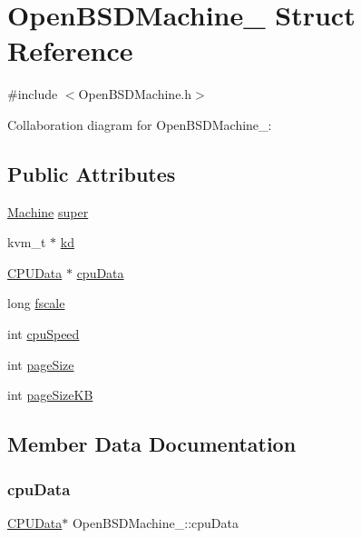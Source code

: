 \hypertarget{structOpenBSDMachine__}{}\section{Open\+B\+S\+D\+Machine\+\_\+ Struct Reference}
\label{structOpenBSDMachine__}


{\ttfamily \#include $<$Open\+B\+S\+D\+Machine.\+h$>$}



Collaboration diagram for Open\+B\+S\+D\+Machine\+\_\+\+:
\subsection*{Public Attributes}
\begin{DoxyCompactItemize}
\item 
\hyperlink{Machine_8h_aa3706f95e4706b9d02979efcabb1341d}{Machine} \hyperlink{structOpenBSDMachine___a8a545d14dad8c9652be6b1f7354b6a84}{super}
\item 
kvm\+\_\+t $\ast$ \hyperlink{structOpenBSDMachine___a5412bdddfb081876ed0a38505955cf32}{kd}
\item 
\hyperlink{DragonFlyBSDMachine_8h_a144f55b34d84d75d470d730435fef363}{C\+P\+U\+Data} $\ast$ \hyperlink{structOpenBSDMachine___a9d9559112a47916c4765872159b4ed49}{cpu\+Data}
\item 
long \hyperlink{structOpenBSDMachine___ad59c1c1e0677c5f156ead7c10056927a}{fscale}
\item 
int \hyperlink{structOpenBSDMachine___a3451335f1b3ff72e17d6f44dfee2ca3e}{cpu\+Speed}
\item 
int \hyperlink{structOpenBSDMachine___a0a5fc14b904bef686b3e515fc379ac4d}{page\+Size}
\item 
int \hyperlink{structOpenBSDMachine___abd95eefc334ee16913fd33ba2c4626ce}{page\+Size\+KB}
\end{DoxyCompactItemize}


\subsection{Member Data Documentation}
\mbox{\label{structOpenBSDMachine___a9d9559112a47916c4765872159b4ed49}} 
\subsubsection{\texorpdfstring{cpu\+Data}{cpuData}}
{\footnotesize\ttfamily \hyperlink{DragonFlyBSDMachine_8h_a144f55b34d84d75d470d730435fef363}{C\+P\+U\+Data}$\ast$ Open\+B\+S\+D\+Machine\+\_\+\+::cpu\+Data}

